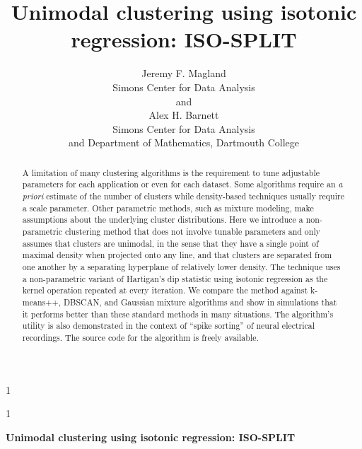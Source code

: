 \documentclass[10pt]{article}
\newcommand{\blind}{1}
\begin{document}


\def\spacingset#1{\renewcommand{\baselinestretch}%
{#1}\small\normalsize} \spacingset{1}


\blind
{
  \title{\bf Unimodal clustering using isotonic regression: ISO-SPLIT}
  \author{Jeremy F. Magland\hspace{.2cm}\\
    Simons Center for Data Analysis\\
    and \\
    Alex H. Barnett \\
    Simons Center for Data Analysis \\ and Department of Mathematics, Dartmouth College}
  \maketitle
} \fi

\blind
{
  \bigskip
  \bigskip
  \bigskip
  \begin{center}
    {\LARGE\bf Unimodal clustering using isotonic regression: ISO-SPLIT}
  \end{center}
  \medskip
} \fi

\bigskip
\begin{abstract}
A limitation of many clustering algorithms is the requirement to tune adjustable parameters for each application or even for each dataset. Some algorithms require an \emph{a priori} estimate of the number of clusters while density-based techniques usually require a scale parameter. Other parametric methods, such as mixture modeling, make assumptions about the underlying cluster distributions. Here we introduce a non-parametric clustering method that does not involve tunable parameters and only assumes that clusters are unimodal, in the sense that they have a single point of maximal density when projected onto any line, and that clusters are separated from one another by a separating hyperplane of relatively lower density. The technique uses a non-parametric variant of Hartigan's dip statistic using isotonic regression as the kernel operation repeated at every iteration. We compare the method against k-means++, DBSCAN, and Gaussian mixture algorithms and show in simulations that it performs better than these standard methods in many situations. The algorithm's utility is also demonstrated in the context of ``spike sorting'' of neural electrical recordings. The source code for the algorithm is freely available.
\end{abstract}
\end{document}
